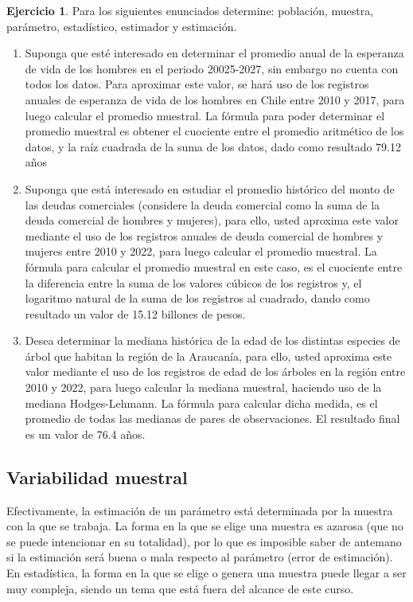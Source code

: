 \documentclass[
  11pt,
]{book}
\theoremstyle{definition}
\theoremstyle{definition}
\theoremstyle{definition}
\newtheorem{exercise}{Ejercicio}[chapter]
\theoremstyle{definition}
\theoremstyle{remark}
\begin{document}
\begin{exercise}

Para los siguientes enunciados determine: población, muestra, parámetro, estadístico, estimador y estimación.

\begin{enumerate}
\def\labelenumi{\arabic{enumi}.}
\item
  Suponga que esté interesado en determinar el promedio anual de la esperanza de vida de los hombres en el periodo 20025-2027, sin embargo no cuenta con todos los datos. Para aproximar este valor, se hará uso de los registros anuales de esperanza de vida de los hombres en Chile entre 2010 y 2017, para luego calcular el promedio muestral. La fórmula para poder determinar el promedio muestral es obtener el cuociente entre el promedio aritmético de los datos, y la raíz cuadrada de la suma de los datos, dado como resultado 79.12 años
\item
  Suponga que está interesado en estudiar el promedio histórico del monto de las deudas comerciales (considere la deuda comercial como la suma de la deuda comercial de hombres y mujeres), para ello, usted aproxima este valor mediante el uso de los registros anuales de deuda comercial de hombres y mujeres entre 2010 y 2022, para luego calcular el promedio muestral. La fórmula para calcular el promedio muestral en este caso, es el cuociente entre la diferencia entre la suma de los valores cúbicos de los registros y, el logaritmo natural de la suma de los registros al cuadrado, dando como resultado un valor de 15.12 billones de pesos.
\item
  Desea determinar la mediana histórica de la edad de los distintas especies de árbol que habitan la región de la Araucanía, para ello, usted aproxima este valor mediante el uso de los registros de edad de los árboles en la región entre 2010 y 2022, para luego calcular la mediana muestral, haciendo uso de la mediana Hodges-Lehmann. La fórmula para calcular dicha medida, es el promedio de todas las medianas de pares de observaciones. El resultado final es un valor de 76.4 años.
\end{enumerate}

\end{exercise}

\subsection{Variabilidad muestral}\label{variabilidad-muestral}

Efectivamente, la estimación de un parámetro está determinada por la muestra con la que se trabaja. La forma en la que se elige una muestra es azarosa (que no se puede intencionar en su totalidad), por lo que es imposible saber de antemano si la estimación será buena o mala respecto al parámetro (error de estimación). En estadística, la forma en la que se elige o genera una muestra puede llegar a ser muy compleja, siendo un tema que está fuera del alcance de este curso.
\end{document}
